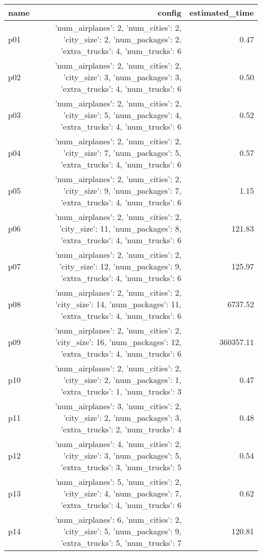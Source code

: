 \documentclass{article}
\begin{document}
                            \begin{center}
                            \scriptsize
                            \begin{tabular}{@{}l|r|r@{}}
                            name & config & estimated\_time\\\midrule
                              p01&{'num\_airplanes': 2, 'num\_cities': 2, 'city\_size': 2, 'num\_packages': 2, 'extra\_trucks': 4, 'num\_trucks': 6}&0.47\\
  p02&{'num\_airplanes': 2, 'num\_cities': 2, 'city\_size': 3, 'num\_packages': 3, 'extra\_trucks': 4, 'num\_trucks': 6}&0.50\\
  p03&{'num\_airplanes': 2, 'num\_cities': 2, 'city\_size': 5, 'num\_packages': 4, 'extra\_trucks': 4, 'num\_trucks': 6}&0.52\\
  p04&{'num\_airplanes': 2, 'num\_cities': 2, 'city\_size': 7, 'num\_packages': 5, 'extra\_trucks': 4, 'num\_trucks': 6}&0.57\\
  p05&{'num\_airplanes': 2, 'num\_cities': 2, 'city\_size': 9, 'num\_packages': 7, 'extra\_trucks': 4, 'num\_trucks': 6}&1.15\\
  p06&{'num\_airplanes': 2, 'num\_cities': 2, 'city\_size': 11, 'num\_packages': 8, 'extra\_trucks': 4, 'num\_trucks': 6}&121.83\\
  p07&{'num\_airplanes': 2, 'num\_cities': 2, 'city\_size': 12, 'num\_packages': 9, 'extra\_trucks': 4, 'num\_trucks': 6}&125.97\\
  p08&{'num\_airplanes': 2, 'num\_cities': 2, 'city\_size': 14, 'num\_packages': 11, 'extra\_trucks': 4, 'num\_trucks': 6}&6737.52\\
  p09&{'num\_airplanes': 2, 'num\_cities': 2, 'city\_size': 16, 'num\_packages': 12, 'extra\_trucks': 4, 'num\_trucks': 6}&360357.11\\
  p10&{'num\_airplanes': 2, 'num\_cities': 2, 'city\_size': 2, 'num\_packages': 1, 'extra\_trucks': 1, 'num\_trucks': 3}&0.47\\
  p11&{'num\_airplanes': 3, 'num\_cities': 2, 'city\_size': 2, 'num\_packages': 3, 'extra\_trucks': 2, 'num\_trucks': 4}&0.48\\
  p12&{'num\_airplanes': 4, 'num\_cities': 2, 'city\_size': 3, 'num\_packages': 5, 'extra\_trucks': 3, 'num\_trucks': 5}&0.54\\
  p13&{'num\_airplanes': 5, 'num\_cities': 2, 'city\_size': 4, 'num\_packages': 7, 'extra\_trucks': 4, 'num\_trucks': 6}&0.62\\
  p14&{'num\_airplanes': 6, 'num\_cities': 2, 'city\_size': 5, 'num\_packages': 9, 'extra\_trucks': 5, 'num\_trucks': 7}&120.81\\

\end{tabular}
\end{center}
\end{document}
